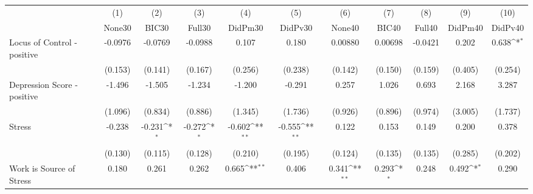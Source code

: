 {
\def\sym#1{\ifmmode^{#1}\else\(^{#1}\)\fi}
\begin{tabular}{l*{10}{c}}
\toprule
            &\multicolumn{1}{c}{(1)}&\multicolumn{1}{c}{(2)}&\multicolumn{1}{c}{(3)}&\multicolumn{1}{c}{(4)}&\multicolumn{1}{c}{(5)}&\multicolumn{1}{c}{(6)}&\multicolumn{1}{c}{(7)}&\multicolumn{1}{c}{(8)}&\multicolumn{1}{c}{(9)}&\multicolumn{1}{c}{(10)}\\
            &\multicolumn{1}{c}{None30}&\multicolumn{1}{c}{BIC30}&\multicolumn{1}{c}{Full30}&\multicolumn{1}{c}{DidPm30}&\multicolumn{1}{c}{DidPv30}&\multicolumn{1}{c}{None40}&\multicolumn{1}{c}{BIC40}&\multicolumn{1}{c}{Full40}&\multicolumn{1}{c}{DidPm40}&\multicolumn{1}{c}{DidPv40}\\
\midrule
Locus of Control - positive&     -0.0976         &     -0.0769         &     -0.0988         &       0.107         &       0.180         &     0.00880         &     0.00698         &     -0.0421         &       0.202         &       0.638\sym{*}  \\
            &     (0.153)         &     (0.141)         &     (0.167)         &     (0.256)         &     (0.238)         &     (0.142)         &     (0.150)         &     (0.159)         &     (0.405)         &     (0.254)         \\
\addlinespace
Depression Score - positive&      -1.496         &      -1.505         &      -1.234         &      -1.200         &      -0.291         &       0.257         &       1.026         &       0.693         &       2.168         &       3.287         \\
            &     (1.096)         &     (0.834)         &     (0.886)         &     (1.345)         &     (1.736)         &     (0.926)         &     (0.896)         &     (0.974)         &     (3.005)         &     (1.737)         \\
\addlinespace
Stress      &      -0.238         &      -0.231\sym{*}  &      -0.272\sym{*}  &      -0.602\sym{**} &      -0.555\sym{**} &       0.122         &       0.153         &       0.149         &       0.200         &       0.378         \\
            &     (0.130)         &     (0.115)         &     (0.128)         &     (0.210)         &     (0.195)         &     (0.124)         &     (0.135)         &     (0.135)         &     (0.285)         &     (0.202)         \\
\addlinespace
Work is Source of Stress&       0.180         &       0.261         &       0.262         &       0.665\sym{**} &       0.406         &       0.341\sym{**} &       0.293\sym{*}  &       0.248         &       0.492\sym{*}  &       0.290         \\

\end{tabular}}
